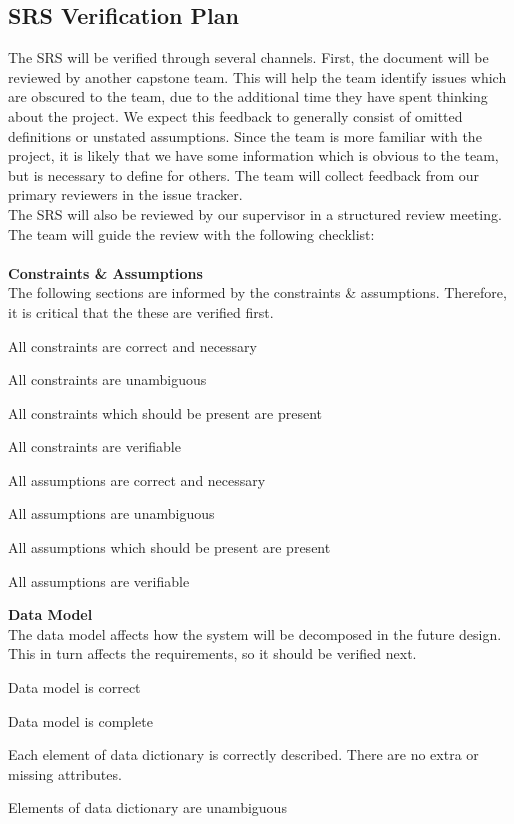 \documentclass[12pt, titlepage]{article}
\begin{document}
\subsection{SRS Verification Plan}

The SRS will be verified through several channels. First, the document will be reviewed by another capstone team. This will help the team identify issues
which are obscured to the team, due to the additional time they have spent thinking about the project. We expect this feedback to generally consist of 
omitted definitions or unstated assumptions. Since the team is more familiar with the project, it is likely that we have some information which is obvious 
to the team, but is necessary to define for others. The team will collect feedback from our primary reviewers in the issue tracker.\\
The SRS will also be reviewed by our supervisor in a structured review meeting. The team will guide the review with the following checklist:\\\\
\textbf{Constraints \& Assumptions}\\
The following sections are informed by the constraints \& assumptions. Therefore, it is critical that the these are verified first.
\begin{todolist}
\item All constraints are correct and necessary
\item All constraints are unambiguous
\item All constraints which should be present are present
\item All constraints are verifiable
\item All assumptions are correct and necessary
\item All assumptions are unambiguous
\item All assumptions which should be present are present
\item All assumptions are verifiable
\end{todolist}
\textbf{Data Model}\\
The data model affects how the system will be decomposed in the future design. This in turn affects the requirements, so it should be verified next.
\begin{todolist}
  \item Data model is correct
  \item Data model is complete
  \item Each element of data dictionary is correctly described. There are no extra or missing attributes.
  \item Elements of data dictionary are unambiguous
\end{todolist}
\end{document}
